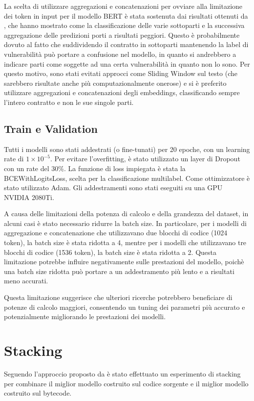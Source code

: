 \documentclass[../../Thesis.tex]{subfiles}
\begin{document}
La scelta di utilizzare aggregazioni e concatenazioni per ovviare alla limitazione dei token in input per il modello BERT \`e stata sostenuta dai risultati ottenuti da \cite{CodeBERTPaper}, che hanno mostrato come la classificazione delle varie sottoparti e la successiva aggregazione delle predizioni porti a risultati peggiori. Questo \`e probabilmente dovuto al fatto che suddividendo il contratto in sottoparti mantenendo la label di vulnerabilit\`a pu\`o portare a confusione nel modello, in quanto si andrebbero a indicare parti come soggette ad una certa vulnerabilit\`a in quanto non lo sono. Per questo motivo, sono stati evitati approcci come Sliding Window sul testo (che sarebbero risultate anche pi\`u computazionalmente onerose) e si \`e preferito utilizzare aggregazioni e concatenazioni degli embeddings, classificando sempre l'intero contratto e non le sue singole parti. 

\subsection{Train e Validation}
Tutti i modelli sono stati addestrati (o fine-tunati) per 20 epoche, con un learning rate di $1 \times 10^{-5}$. Per evitare l'overfitting, \`e stato utilizzato un layer di Dropout con un rate del 30\%. La funzione di loss impiegata \`e stata la BCEWithLogitsLoss, scelta per la classificazione multilabel. Come ottimizzatore \`e stato utilizzato Adam. Gli addestramenti sono stati eseguiti su una GPU NVIDIA 2080Ti.

A causa delle limitazioni della potenza di calcolo e della grandezza del dataset, in alcuni casi \`e stato necessario ridurre la batch size. In particolare, per i modelli di aggregazione e concatenazione che utilizzavano due blocchi di codice (1024 token), la batch size \`e stata ridotta a 4, mentre per i modelli che utilizzavano tre blocchi di codice (1536 token), la batch size \`e stata ridotta a 2. Questa limitazione potrebbe influire negativamente sulle prestazioni del modello, poich\`e una batch size ridotta pu\`o portare a un addestramento pi\`u lento e a risultati meno accurati.

Questa limitazione suggerisce che ulteriori ricerche potrebbero beneficiare di potenze di calcolo maggiori, consentendo un tuning dei parametri pi\`u accurato e potenzialmente migliorando le prestazioni dei modelli.

\section{Stacking}
Seguendo l'approccio proposto da \cite{Deng} \`e stato effettuato un esperimento di stacking per combinare il miglior modello costruito sul codice sorgente e il miglior modello costruito sul bytecode.
\end{document}

